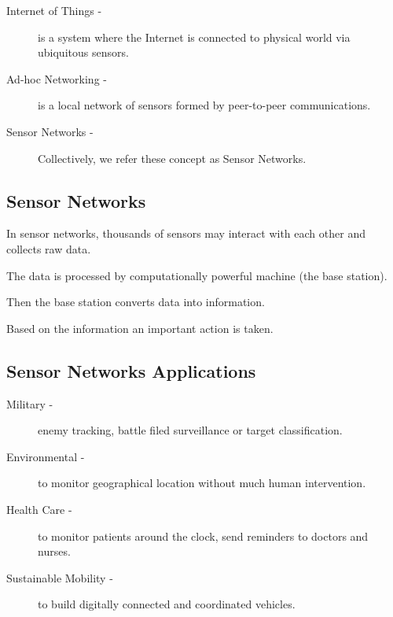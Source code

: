 \documentclass[%
  slidesonly,%
  semlayer%
  ]{seminar}                                  %
\begin{document}
\begin{slide}
\begin{description}
    \item[Internet of Things -] is a system where the Internet is connected to physical world via ubiquitous sensors.
    
    \item[Ad-hoc Networking -] is a local network of sensors formed by peer-to-peer communications.
    
    \item[Sensor Networks -] Collectively, we refer these concept as Sensor Networks.
  \end{description}
  \vfill
  \clearpage

  \subsection*{Sensor Networks}
    \vfill  
    In sensor networks, thousands of sensors may interact with each other and collects raw data.

    The data is processed by computationally powerful machine (the base station).

    Then the base station converts data into information.

    Based on the information an important action is taken.

    \vfill
    \clearpage

  \subsection*{Sensor Networks Applications}
    \vfill
    \begin{description}
    \item[Military -] enemy tracking, battle filed surveillance or target classification.

    \item[Environmental -] to monitor geographical location without much human intervention.
    
    \item[Health Care -]  to monitor patients around the clock, send reminders to doctors and nurses.
  
    \item[Sustainable Mobility -] to build digitally connected and coordinated vehicles.
    \end{description}
    \vfill
    \clearpage


\end{slide}
\end{document}
